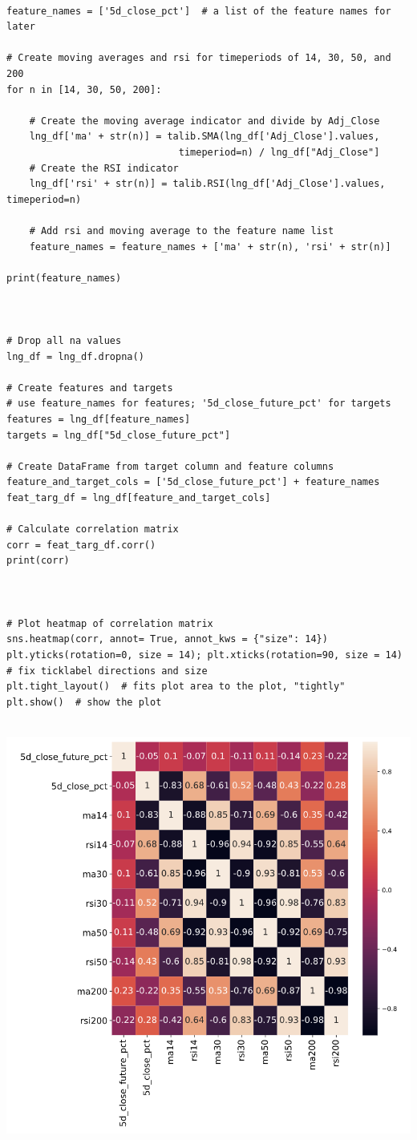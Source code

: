 \documentclass[11pt]{article}
\begin{document}
\begin{verbatim}

feature_names = ['5d_close_pct']  # a list of the feature names for later

# Create moving averages and rsi for timeperiods of 14, 30, 50, and 200
for n in [14, 30, 50, 200]:

    # Create the moving average indicator and divide by Adj_Close
    lng_df['ma' + str(n)] = talib.SMA(lng_df['Adj_Close'].values,
                              timeperiod=n) / lng_df["Adj_Close"]
    # Create the RSI indicator
    lng_df['rsi' + str(n)] = talib.RSI(lng_df['Adj_Close'].values, timeperiod=n)

    # Add rsi and moving average to the feature name list
    feature_names = feature_names + ['ma' + str(n), 'rsi' + str(n)]

print(feature_names)



# Drop all na values
lng_df = lng_df.dropna()

# Create features and targets
# use feature_names for features; '5d_close_future_pct' for targets
features = lng_df[feature_names]
targets = lng_df["5d_close_future_pct"]

# Create DataFrame from target column and feature columns
feature_and_target_cols = ['5d_close_future_pct'] + feature_names
feat_targ_df = lng_df[feature_and_target_cols]

# Calculate correlation matrix
corr = feat_targ_df.corr()
print(corr)



# Plot heatmap of correlation matrix
sns.heatmap(corr, annot= True, annot_kws = {"size": 14})
plt.yticks(rotation=0, size = 14); plt.xticks(rotation=90, size = 14)  # fix ticklabel directions and size
plt.tight_layout()  # fits plot area to the plot, "tightly"
plt.show()  # show the plot


\end{verbatim}



\begin{center}
\includegraphics[width=.9\linewidth]{corr.png}
\end{center}
\end{document}
